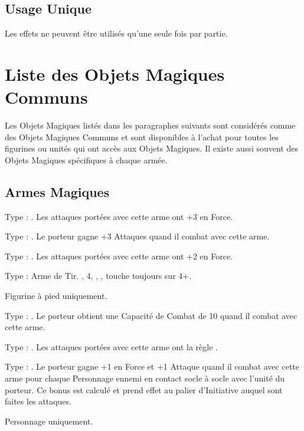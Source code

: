 \subsection{Usage Unique}

Les effets ne peuvent être utilisés qu'une seule fois par partie.

\section{Liste des Objets Magiques Communs}

Les Objets Magiques listés dans les paragraphes suivants sont considérés comme des Objets Magiques Communs et sont disponibles à l'achat pour toutes les figurines ou unités qui ont accès aux Objets Magiques. Il existe aussi souvent des Objets Magiques spécifiques à chaque armée.

\newpage
\subsection{Armes Magiques}

\startpricelist

Type : \hw{}.  Les attaques portées avec cette arme ont +3 en Force.

Type : \hw{}. Le porteur gagne +3 Attaques quand il combat avec cette arme.

Type : \hw{}. Les attaques portées avec cette arme ont +2 en Force.

Type : Arme de Tir. , \Strength{} 4, , , touche toujours sur 4+.

Figurine à pied uniquement.

Type : \pw{}. Le porteur obtient une Capacité de Combat de 10 quand il combat avec cette arme.

Type : \hw{}. Les attaques portées avec cette arme ont la règle .

Type : \hw{}. Le porteur gagne +1 en Force et +1 Attaque quand il combat avec cette arme pour chaque Personnage ennemi en contact socle à socle avec l'unité du porteur. Ce bonus est calculé et prend effet au palier d'Initiative auquel sont faites les attaques.

Personnage uniquement.


